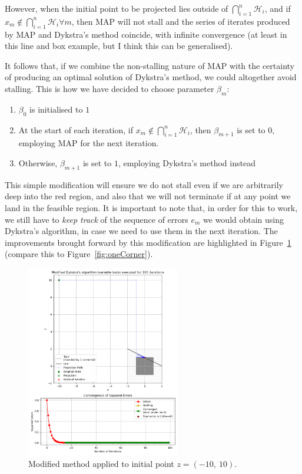 \documentclass[hidelinks]{article}
\begin{document}
%
\newpage
However, when the initial point to be projected lies outside of $\bigcap_{i=1}^n \mathcal{H}_i$, and if $x_m \notin \bigcap_{i=1}^n \mathcal{H}_i \forall m$, then MAP will not stall and the series of iterates produced by MAP and Dykstra's method coincide, with infinite convergence (at least in this line and box example, but I think this can be generalised).
\par It follows that, if we combine the non-stalling nature of MAP with the certainty of producing an optimal solution of Dykstra's method, we could altogether avoid stalling. This is how we have decided to choose parameter $\beta_m$:
%
\begin{enumerate}
\item $\beta_0$ is initialised to $1$
\item At the start of each iteration, if $x_m \notin \bigcap_{i=1}^n \mathcal{H}_i$, then $\beta_{m+1}$ is set to $0$, employing MAP for the next iteration.
\item Otherwise, $\beta_{m+1}$ is set to $1$, employing Dykstra's method instead
\end{enumerate}
%
\par This simple modification will ensure we do not stall even if we are arbitrarily deep into the red region, and also that we will not terminate if at any point we land in the feasible region. It is important to note that, in order for this to work, we still have to \textit{keep track} of the sequence of errors $e_m$ we would obtain using Dykstra's algorithm, in case we need to use them in the next iteration. The improvements brought forward by this modification are highlighted in Figure~\ref{fig:oneCornerModified} (compare this to Figure~\ref{fig:oneCorner}).
%
\begin{figure}[h!]
    \centering
    
    \includegraphics[width=0.6\textwidth]{not_in_intersection_modified.png}
    \caption{Modified method applied to initial point $z = (-10,~10)$.}
    \label{fig:oneCornerModified}

\end{figure}
\end{document}
